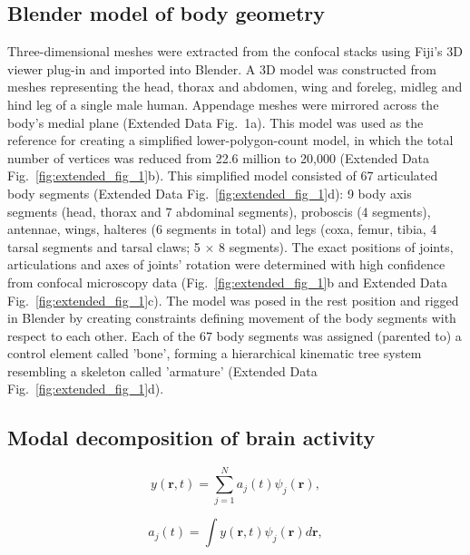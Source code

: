 \documentclass[sn-mathphys-num]{sn-jnl}%
\theoremstyle{thmstyleone}%
\theoremstyle{thmstyletwo}%
\theoremstyle{thmstylethree}%
\begin{document}
\subsection{Blender model of body geometry} \label{sec:derivation}


Three-dimensional meshes were extracted from the confocal stacks using Fiji's 3D viewer plug-in\cite{schindelin2012fiji} and imported into Blender\cite{community2018blender}.
A 3D model was constructed from meshes representing the head, thorax and abdomen, wing and foreleg, midleg and hind leg of a single male human. 
Appendage meshes were mirrored across the body's medial plane (Extended Data Fig. 1a). 
This model was used as the reference for creating a simplified lower-polygon-count model, in which the total number of vertices was reduced from 22.6 million to 20,000 (Extended Data Fig.~\ref{fig:extended_fig_1}b).
This simplified model consisted of 67 articulated body segments (Extended Data Fig.~\ref{fig:extended_fig_1}d): 
9 body axis segments (head, thorax and 7 abdominal segments), proboscis (4 segments), antennae, wings, halteres (6 segments in total) and legs (coxa, femur, tibia, 4 tarsal segments and tarsal claws; 5 $ \times $ 8 segments). 
The exact positions of joints, articulations and axes of joints' rotation were determined with high confidence from confocal microscopy data (Fig.~\ref{fig:extended_fig_1}b and Extended Data Fig.~\ref{fig:extended_fig_1}c). 
The model was posed in the rest position and rigged in Blender by creating constraints defining movement of the body segments with respect to each other. 
Each of the 67 body segments was assigned (parented to) a control element called 'bone', forming a hierarchical kinematic tree system resembling a skeleton called 'armature' (Extended Data Fig.~\ref{fig:extended_fig_1}d).





\subsection{Modal decomposition of brain activity} \label{sec:modal_decomposition}


\begin{equation}\label{eq:weighted_sum}
	y(\textbf{r}, t) = \sum_{j=1}^{N} a_j(t) \psi_j(\textbf{r}),
\end{equation}


\begin{equation}\label{eq:amplitudes}
	a_j(t) = \int y(\textbf{r}, t) \psi_j(\textbf{r}) d\textbf{r}, 
\end{equation}
\end{document}
